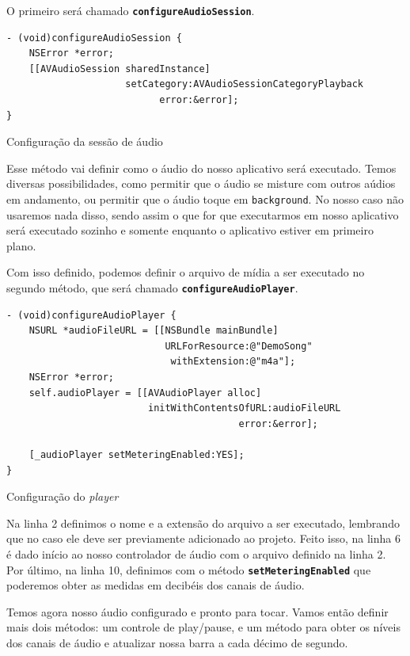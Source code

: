 \documentclass[a4paper,12pt,brazil,oneside]{book}
\begin{document}
O primeiro será chamado \texttt{\textbf{configureAudioSession}}.

\begin{listing}[H]
\begin{verbatim}
- (void)configureAudioSession {
    NSError *error;
    [[AVAudioSession sharedInstance]
                     setCategory:AVAudioSessionCategoryPlayback
                           error:&error];
}
\end{verbatim}
\caption{Configuração da sessão de áudio}
\end{listing}


Esse método vai definir como o áudio do nosso aplicativo será executado. Temos diversas possibilidades, como permitir que o áudio se misture com outros aúdios em andamento, ou permitir que o áudio toque em \texttt{background}. No nosso caso não usaremos nada disso, sendo assim o que for que executarmos em nosso aplicativo será executado sozinho e somente enquanto o aplicativo estiver em primeiro plano.

Com isso definido, podemos definir o arquivo de mídia a ser executado no segundo método, que será chamado \texttt{\textbf{configureAudioPlayer}}.

\begin{listing}[H]
\begin{verbatim}
- (void)configureAudioPlayer {
    NSURL *audioFileURL = [[NSBundle mainBundle]
                            URLForResource:@"DemoSong"
                             withExtension:@"m4a"];
    NSError *error;
    self.audioPlayer = [[AVAudioPlayer alloc]
                         initWithContentsOfURL:audioFileURL
                                         error:&error];
    
    [_audioPlayer setMeteringEnabled:YES];
}
\end{verbatim}
\caption{Configuração do \emph{player}}
\end{listing}


Na linha 2 definimos o nome e a extensão do arquivo a ser executado, lembrando que no caso ele deve ser previamente adicionado ao projeto. Feito isso, na linha 6 é dado início ao nosso controlador de áudio com o arquivo definido na linha 2. Por último, na linha 10, definimos com o método \texttt{\textbf{setMeteringEnabled}} que poderemos obter as medidas em decibéis dos canais de áudio.

Temos agora nosso áudio configurado e pronto para tocar. Vamos então definir mais dois métodos: um controle de play/pause, e um método para obter os níveis dos canais de áudio e atualizar nossa barra a cada décimo de segundo.
\end{document}
